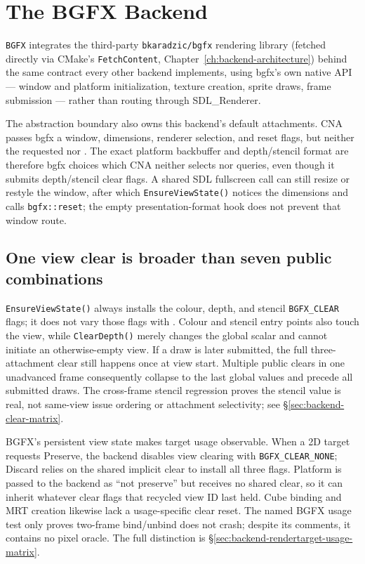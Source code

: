 \chapter{The BGFX Backend}
\label{ch:bgfx-backend}

\texttt{BGFX} integrates the third-party \texttt{bkaradzic/bgfx} rendering library (fetched
directly via CMake's \texttt{FetchContent}, Chapter~\ref{ch:backend-architecture}) behind the
same contract every other backend implements, using bgfx's own native API --- window and
platform initialization, texture creation, sprite draws, frame submission --- rather than
routing through SDL\_Renderer.

\begin{sourcenote}
The abstraction boundary also owns this backend's default attachments. CNA passes bgfx a
window, dimensions, renderer selection, and reset flags, but neither the requested
 nor . The exact platform backbuffer and
depth/stencil format are therefore bgfx choices which CNA neither selects nor queries, even
though it submits depth/stencil clear flags. A shared SDL fullscreen call can still resize or
restyle the window, after which \texttt{EnsureViewState()} notices the dimensions and calls
\texttt{bgfx::reset}; the empty presentation-format hook does not prevent that window route.
\end{sourcenote}

\section{One view clear is broader than seven public combinations}

\texttt{EnsureViewState()} always installs the colour, depth, and stencil
\texttt{BGFX\_CLEAR} flags; it does not vary those flags with
. Colour and stencil entry points also touch the view, while
\texttt{ClearDepth()} merely changes the global scalar and cannot initiate an otherwise-empty
view. If a draw is later submitted, the full three-attachment clear still happens once at view
start. Multiple public clears in one unadvanced frame consequently collapse to the last global
values and precede all submitted draws. The cross-frame stencil regression proves the stencil
value is real, not same-view issue ordering or attachment selectivity; see
\S\ref{sec:backend-clear-matrix}.

BGFX's persistent view state makes target usage observable. When a 2D target requests
Preserve, the backend disables view clearing with
\texttt{BGFX\_\allowbreak{}CLEAR\_\allowbreak{}NONE}; Discard relies on the shared implicit
clear to install all three flags. Platform is passed to the backend as ``not preserve'' but
receives no shared clear, so it can inherit whatever clear flags that recycled view ID last
held. Cube binding and MRT creation likewise lack a usage-specific clear reset. The named BGFX
usage test only proves two-frame bind/unbind does not crash; despite its comments, it contains
no pixel oracle. The full distinction is
\S\ref{sec:backend-rendertarget-usage-matrix}.

